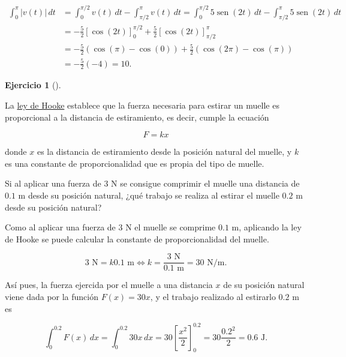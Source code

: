\documentclass[
  spanish,
  a4paper,
]{scrreport}
\theoremstyle{definition}
\newtheorem{exercise}{Ejercicio}[chapter]
\theoremstyle{remark}
\begin{document}
\begin{tcolorbox}
\begin{align*}
\int_0^\pi |v(t)|\,dt 
&= \int_0^{\pi/2} v(t)\,dt - \int_{\pi/2}^\pi v(t)\,dt 
= \int_0^{\pi/2} 5\operatorname{sen}(2t)\,dt - \int_{\pi/2}^\pi 5\operatorname{sen}(2t)\,dt\\
&= -\frac{5}{2}[\cos(2t)]_0^{\pi/2} + \frac{5}{2}[\cos(2t)]_{\pi/2}^\pi \\
&= -\frac{5}{2}(\cos(\pi)-\cos(0)) + \frac{5}{2}(\cos(2\pi)- \cos(\pi)) \\
&= -\frac{5}{2}(-4) 
= 10.
\end{align*}

\end{tcolorbox}

\begin{exercise}[]\protect\hypertarget{exr-trabajo-muelle}{}\label{exr-trabajo-muelle}

La \href{https://es.wikipedia.org/wiki/Ley_de_elasticidad_de_Hooke}{ley
de Hooke} establece que la fuerza necesaria para estirar un muelle es
proporcional a la distancia de estiramiento, es decir, cumple la
ecuación

\[
F = kx
\]

donde \(x\) es la distancia de estiramiento desde la posición natural
del muelle, y \(k\) es una constante de proporcionalidad que es propia
del tipo de muelle.

Si al aplicar una fuerza de \(3\) N se consigue comprimir el muelle una
distancia de \(0.1\) m desde su posición natural, ¿qué trabajo se
realiza al estirar el muelle \(0.2\) m desde su posición natural?

\end{exercise}

\begin{tcolorbox}[enhanced jigsaw, arc=.35mm, bottomrule=.15mm, bottomtitle=1mm, breakable, colback=white, colbacktitle=quarto-callout-tip-color!10!white, colframe=quarto-callout-tip-color-frame, coltitle=black, left=2mm, leftrule=.75mm, opacityback=0, opacitybacktitle=0.6, rightrule=.15mm, title=\textcolor{quarto-callout-tip-color}{\faLightbulb}\hspace{0.5em}{Solución}, titlerule=0mm, toprule=.15mm, toptitle=1mm]

Como al aplicar una fuerza de \(3\) N el muelle se comprime \(0.1\) m,
aplicando la ley de Hooke se puede calcular la constante de
proporcionalidad del muelle.

\[
3 \mbox{ N} = k 0.1 \mbox{ m} \Leftrightarrow k = \frac{3 \mbox{ N}}{0.1 \mbox{ m}} = 30 \mbox{ N/m}.
\]

Así pues, la fuerza ejercida por el muelle a una distancia \(x\) de su
posición natural viene dada por la función \(F(x) = 30 x\), y el trabajo
realizado al estirarlo \(0.2\) m es

\[
\int_0^{0.2} F(x)\,dx 
= \int_0^{0.2} 30 x\,dx 
= 30 \left[\frac{x^2}{2}\right]_0^{0.2} 
= 30 \frac{0.2^2}{2} 
= 0.6 \mbox{ J}.
\]

\end{tcolorbox}
\end{document}
